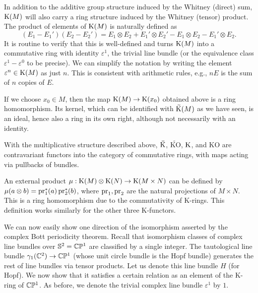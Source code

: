 In addition to the additive group structure induced by the Whitney (direct) sum, $\mathrm{K}(M)$ will also carry a ring structure induced by the Whitney (tensor) product. The product of elements of $\mathrm{K}(M)$ is naturally defined as 
\[(E_1-E_1')(E_2-E_2')=E_1\otimes E_2+ E_1'\otimes E_2'-E_1\otimes E_2-E_1'\otimes E_2.\]
It is routine to verify that this is well-defined and turns $\mathrm{K}(M)$ into a commutative ring with identity $\varepsilon^1$, the trivial line bundle (or the equivalence class $\varepsilon^1-\varepsilon^0$ to be precise). We can simplify the notation by writing the element $\varepsilon^n\in \mathrm{K}(M)$ as just $n$. This is consistent with arithmetic rules, e.g., $nE$ is the sum of $n$ copies of $E$.

If we choose $x_0\in M$, then the map $\mathrm{K}(M)\to \mathrm{K}(x_0)$ obtained above is a ring homomorphism. Its kernel, which can be identified with $\wt{\rmK}(M)$ as we have seen, is an ideal, hence also a ring in its own right, although not necessarily with an identity.

\begin{defn}[K-rings]
    With the multiplicative structure described above, $\wt{\rmK}$, $\widetilde{\mathrm{KO}}$, $\mathrm{K}$, and $\mathrm{KO}$ are contravariant functors into the category of commutative rings, with maps acting via pullbacks of bundles.
\end{defn}

\begin{defn}
    An external product $\mu:\mathrm{K}(M)\otimes \mathrm{K}(N)\to \mathrm{K}(M\times N)$ can be defined by $\mu(a\otimes b)=\operatorname{pr}_1^\ast(a)\operatorname{pr}_2^\ast(b)$, where $\operatorname{pr}_1,\operatorname{pr}_2$ are the natural projections of $M\times N$. This is a ring homomorphism due to the commutativity of K-rings. This definition works similarly for the other three K-functors.
\end{defn}


We can now easily show one direction of the isomorphism asserted by the complex Bott periodicity theorem. Recall that isomorphism classes of complex line bundles over $\mathbb{S}^2=\mathbb{C}\mathbb{P}^1$ are classified by a single integer. The tautological line bundle $\gamma_1(\mathbb{C}^2)\to \mathbb{C}\mathbb{P}^1$ (whose unit circle bundle is the Hopf bundle) generates the rest of line bundles via tensor products. Let us denote this line bundle $H$ (for Hopf). We now show that it satisfies a certain relation as an element of the K-ring of $\mathbb{C}\mathbb{P}^1$. As before, we denote the trivial complex line bundle $\varepsilon^1$ by $1$.

